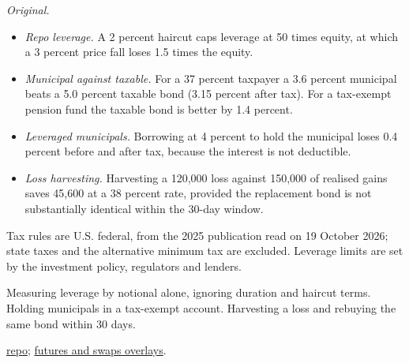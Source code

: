 \begin{qfmethod}
\emph{Original.}
\begin{itemize}
\item \emph{Repo leverage.} A 2 percent haircut caps leverage at 50 times equity, at which a 3 percent price fall loses 1.5 times the equity.
\item \emph{Municipal against taxable.} For a 37 percent taxpayer a 3.6 percent municipal beats a 5.0 percent taxable bond (3.15 percent after tax). For a tax-exempt pension fund the taxable bond is better by 1.4 percent.
\item \emph{Leveraged municipals.} Borrowing at 4 percent to hold the municipal loses 0.4 percent before and after tax, because the interest is not deductible.
\item \emph{Loss harvesting.} Harvesting a 120{,}000 loss against 150{,}000 of realised gains saves 45{,}600 at a 38 percent rate, provided the replacement bond is not substantially identical within the 30-day window.
\end{itemize}

 Tax rules are U.S. federal, from the 2025 publication read on 19 October 2026; state taxes and the alternative minimum tax are excluded. Leverage limits are set by the investment policy, regulators and lenders.

 Measuring leverage by notional alone, ignoring duration and haircut terms. Holding municipals in a tax-exempt account. Harvesting a loss and rebuying the same bond within 30 days.

 \hyperref[def:short-term-funding-repo]{repo}; \hyperref[meth:forward-commitment-risk-overlays]{futures and swaps overlays}.

\end{qfmethod}

